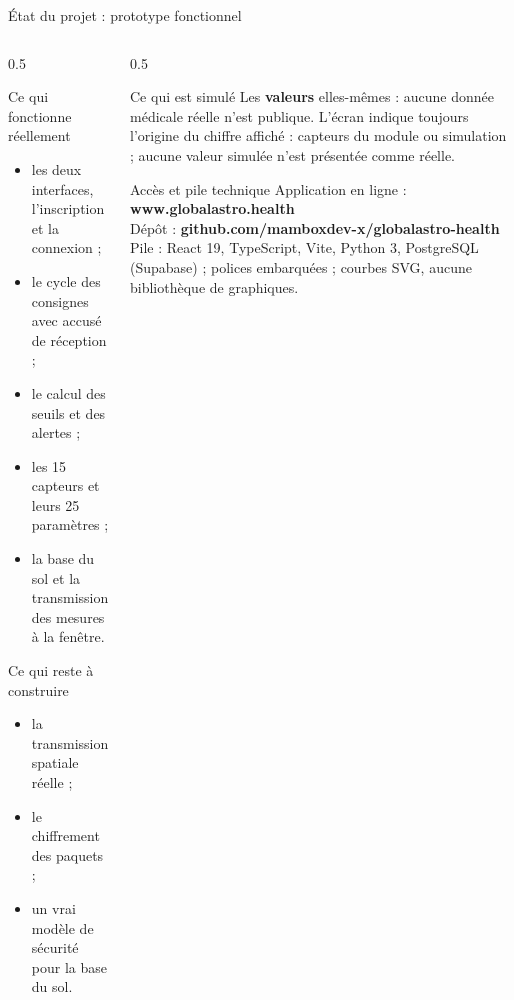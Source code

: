 \documentclass[aspectratio=169,11pt]{beamer}
\begin{document}
\begin{frame}{\'Etat du projet : prototype fonctionnel}
\begin{columns}[t]
\begin{column}{0.5\textwidth}
\begin{block}{Ce qui fonctionne r\'eellement}
\begin{itemize}
  \item les deux interfaces, l'inscription et la connexion ;
  \item le cycle des consignes avec accus\'e de r\'eception ;
  \item le calcul des seuils et des alertes ;
  \item les 15 capteurs et leurs 25 param\`etres ;
  \item la base du sol et la transmission des mesures \`a la fen\^etre.
\end{itemize}
\end{block}
\vspace{-0.45cm}
\begin{block}{Ce qui reste \`a construire}
\begin{itemize}
  \item la transmission spatiale r\'eelle ;
  \item le chiffrement des paquets ;
  \item un vrai mod\`ele de s\'ecurit\'e pour la base du sol.
\end{itemize}
\end{block}
\end{column}
\begin{column}{0.5\textwidth}
\begin{block}{Ce qui est simul\'e}
\footnotesize
Les \textbf{valeurs} elles-m\^emes : aucune donn\'ee m\'edicale r\'eelle n'est publique. L'\'ecran indique toujours l'origine du chiffre affich\'e : \og{}capteurs du module\fg{} ou \og{}simulation\fg{} ; aucune valeur simul\'ee n'est pr\'esent\'ee comme r\'eelle.
\end{block}
\vspace{-0.45cm}
\begin{block}{Acc\`es et pile technique}
\footnotesize
Application en ligne : \textbf{www.globalastro.health}\\
D\'ep\^ot : \textbf{github.com/mamboxdev-x/globalastro-health}\\
Pile : React 19, TypeScript, Vite, Python 3, PostgreSQL (Supabase) ; polices embarqu\'ees ; courbes SVG, aucune biblioth\`eque de graphiques.
\end{block}
\end{column}
\end{columns}
\end{frame}
\end{document}

